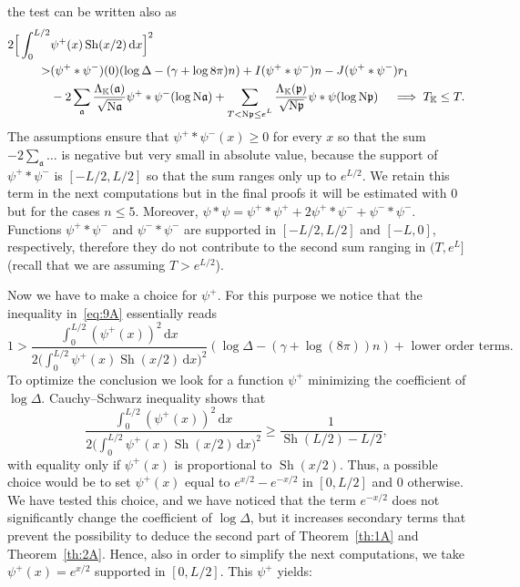 \documentclass[a4paper,11pt]{amsart}
\newcommand{\field}[1]{\mathbb{{#1}}}
\newcommand{\ideal}[1]{\mathfrak{{#1}}}
\newcommand{\K}{\field{{K}}}
\newcommand{\p}{\ideal{p}}
\renewcommand{\a}{\ideal{a}}
\newcommand{\Norm}{\textrm{\upshape N}}
\newcommand{\dd}{\,\mathrm{d}}
\DeclareMathOperator{\Sh}{Sh}
\theoremstyle{remark}
\begin{document}
the test can be written also as
\begin{align}
2\Big[\int_{0}^{L/2} &\psi^+(x)\Sh(x/2) \dd x \Big]^2                                                     \notag \\
>&  (\psi^+\ast\psi^-)(0)(\log \Delta - (\gamma+\log 8\pi)n)
   + I(\psi^+\ast\psi^-) n
   - J(\psi^+\ast\psi^-) r_1                                                                              \notag \\
&  - 2\sum_{\a} \frac{\Lambda_{\K}(\a)}{\sqrt{\Norm\a}} \psi^+\ast\psi^-(\log\Norm\a)
   +  \sum_{\substack{T< \Norm\p \leq e^L}} \frac{\Lambda_{\K}(\p)}{\sqrt{\Norm\p}} \psi\ast\psi(\log \Norm\p)
\quad
\implies T_\K \leq T.                                                                                     \label{eq:9A}
\end{align}
%
The assumptions ensure that $\psi^+\ast\psi^-(x) \geq 0$ for every $x$ so that the sum $-2\sum_\a \dots$
is negative but very small in absolute value, because the support of $\psi^+\ast\psi^-$ is $[-L/2,L/2]$
so that the sum ranges only up to $e^{L/2}$. We retain this term in the next computations but in the
final proofs it will be estimated with $0$ but for the cases $n \leq 5$. Moreover, $\psi\ast\psi =
\psi^+\ast\psi^+ + 2\psi^+\ast\psi^- + \psi^-\ast\psi^- $. Functions $\psi^+\ast\psi^-$ and
$\psi^-\ast\psi^-$ are supported in $[-L/2,L/2]$ and $[-L,0]$, respectively, therefore they do not
contribute to the second sum ranging in $(T,e^L]$ (recall that we are assuming $T> e^{L/2}$).

Now we have to make a choice for $\psi^+$. For this purpose we notice that the inequality
in~\eqref{eq:9A} essentially reads
\[
1
   > \frac{\int_0^{L/2} ({\psi^+}(x))^2\dd x}{2\big(\int_{0}^{L/2} \psi^+(x)\Sh(x/2) \dd x\big)^2}(\log\Delta - (\gamma+\log(8\pi))n)
        + \text{ lower order terms}.
\]
To optimize the conclusion we look for a function $\psi^+$ minimizing the coefficient of $\log\Delta$.
Cauchy--Schwarz inequality shows that
\[
\frac{\int_0^{L/2} ({\psi^+}(x))^2\dd x}{2\big(\int_{0}^{L/2} \psi^+(x)\Sh(x/2) \dd x\big)^2}
\geq \frac{1}{\Sh(L/2)-L/2},
\]
with equality only if $\psi^+(x)$ is proportional to $\Sh(x/2)$. Thus, a possible choice would be to set
$\psi^+(x)$ equal to $e^{x/2} - e^{-x/2}$ in $[0,L/2]$ and $0$ otherwise. We have tested this choice, and
we have noticed that the term $e^{-x/2}$ does not significantly change the coefficient of $\log\Delta$,
but it increases secondary terms that prevent the possibility to deduce the second part of
Theorem~\ref{th:1A} and Theorem~\ref{th:2A}. Hence, also in order to simplify the next computations, we
take $\psi^+(x) = e^{x/2}$ supported in $[0,L/2]$. This $\psi^+$ yields:
\end{document}

